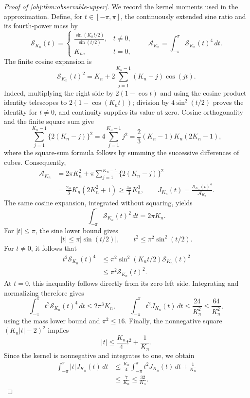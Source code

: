 \begin{proof}[Proof of \cref{obj:thm:observable-upper}]
We record the kernel moments used in the approximation. Define, for \(t\in[-\pi,\pi]\), the continuously extended sine ratio and its fourth-power mass by
\[
\mathcal S_{K_n}(t)=
\begin{cases}
\displaystyle\frac{\sin(K_nt/2)}{\sin(t/2)},&t\ne0,\\[4pt]
K_n,&t=0,
\end{cases}
\qquad
\mathcal A_{K_n}=\int_{-\pi}^{\pi}\mathcal S_{K_n}(t)^4\,dt.
\]
The finite cosine expansion is
\[
\mathcal S_{K_n}(t)^2
=K_n+2\sum_{j=1}^{K_n-1}(K_n-j)\cos(jt).
\]
Indeed, multiplying the right side by \(2(1-\cos t)\) and using the cosine product identity telescopes to \(2(1-\cos(K_nt))\); division by \(4\sin^2(t/2)\) proves the identity for \(t\ne0\), and continuity supplies its value at zero. Cosine orthogonality and the finite square sum give
\[
\sum_{j=1}^{K_n-1}\{2(K_n-j)\}^2
=4\sum_{j=1}^{K_n-1}j^2
=\frac23(K_n-1)K_n(2K_n-1),
\]
where the square-sum formula follows by summing the successive differences of cubes. Consequently,
\[
\begin{aligned}
\mathcal A_{K_n}
&=2\pi K_n^2+
\pi\sum_{j=1}^{K_n-1}\{2(K_n-j)\}^2\\
&=\frac{2\pi}{3}K_n(2K_n^2+1)
\ge\frac{4\pi}{3}K_n^3,
\qquad
J_{K_n}(t)=\frac{\mathcal S_{K_n}(t)^4}{\mathcal A_{K_n}}.
\end{aligned}
\]
The same cosine expansion, integrated without squaring, yields
\[
\int_{-\pi}^{\pi}\mathcal S_{K_n}(t)^2\,dt=2\pi K_n.
\]
For \(|t|\le\pi\), the sine lower bound gives
\[
|t|\le\pi|\sin(t/2)|,
\qquad
t^2\le\pi^2\sin^2(t/2).
\]
For \(t\ne0\), it follows that
\[
\begin{aligned}
t^2\mathcal S_{K_n}(t)^4
&\le\pi^2\sin^2(K_nt/2)\mathcal S_{K_n}(t)^2\\
&\le\pi^2\mathcal S_{K_n}(t)^2.
\end{aligned}
\]
At \(t=0\), this inequality follows directly from its zero left side. Integrating and normalizing therefore gives
\[
\int_{-\pi}^{\pi}t^2\mathcal S_{K_n}(t)^4\,dt
\le2\pi^3K_n,
\qquad
\int_{-\pi}^{\pi}t^2J_{K_n}(t)\,dt
\le\frac{24}{K_n^2}\le\frac{64}{K_n^2},
\]
using the mass lower bound and \(\pi^2\le16\).
Finally, the nonnegative square \((K_n|t|-2)^2\) implies
\[
|t|\le\frac{K_n}{4}t^2+\frac1{K_n}.
\]
Since the kernel is nonnegative and integrates to one, we obtain
\[
\begin{aligned}
\int_{-\pi}^{\pi}|t|J_{K_n}(t)\,dt
&\le\frac{K_n}{4}
\int_{-\pi}^{\pi}t^2J_{K_n}(t)\,dt+\frac1{K_n}\\
&\le\frac7{K_n}\le\frac{32}{K_n}.

\end{aligned}\]
\end{proof}

